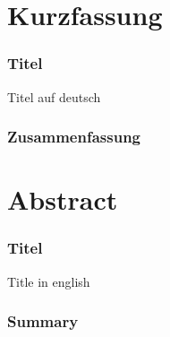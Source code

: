 \section*{Kurzfassung}
\subsubsection*{Titel}
Titel auf deutsch
\vfill
\subsubsection*{Zusammenfassung}

\blindtext
\vfill

\section*{Abstract}
\subsubsection*{Titel}
Title in english

\vfill
\subsubsection*{Summary}

\blindtext
\vfill
